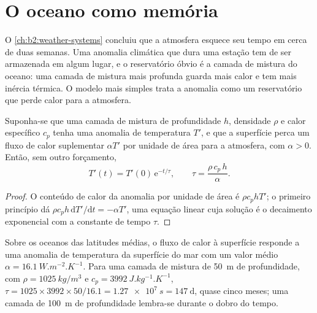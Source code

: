 \section{O oceano como memória}\label{sec:b2:climate-variability:memory}

O \cref{ch:b2:weather-systems} concluiu que a atmosfera esquece seu tempo em cerca de duas semanas.
Uma anomalia climática que dura uma estação tem de ser armazenada em algum lugar, e o reservatório óbvio é a camada
de mistura do oceano: uma camada de mistura mais profunda guarda mais calor e tem mais inércia térmica. O modelo mais simples trata a
anomalia como um reservatório que perde calor para a atmosfera.

\begin{proposition}\label{prop:b2:climate-variability:damping}
Suponha-se que uma camada de mistura de profundidade $h$, densidade $\rho$ e calor específico $c_p$ tenha uma anomalia de temperatura
$T'$, e que a superfície perca um fluxo de calor suplementar $\alpha T'$ por unidade de área para a atmosfera,
com $\alpha > 0$. Então, sem outro forçamento,
\[
  T'(t) = T'(0)\,\mathrm{e}^{-t/\tau}, \qquad \tau = \frac{\rho\,c_p\,h}{\alpha} .
\]
\end{proposition}

\begin{proof}
O conteúdo de calor da anomalia por unidade de área é $\rho c_p h T'$; o primeiro princípio dá $\rho c_p h
\,\mathrm{d}T'/\mathrm{d}t = -\alpha T'$, uma equação linear cuja solução é o decaimento
exponencial com a constante de tempo $\tau$.
\end{proof}

\begin{example}\label{ex:b2:climate-variability:tau}
Sobre os oceanos das latitudes médias, o fluxo de calor à superfície responde a uma anomalia de temperatura da superfície
do mar com um valor médio $\alpha = \qty{16.1}{W.m^{-2}.K^{-1}}$. Para uma camada de mistura
de \qty{50}{m} de profundidade, com $\rho = \qty{1025}{kg/m^3}$ e $c_p = \qty{3992}{J.kg^{-1}.K^{-1}}$,
$\tau = 1025 \times 3992 \times 50/16.1 = \qty{1.27e7}{s} = \qty{147}{\day}$, quase cinco
meses; uma camada de \qty{100}{m} de profundidade lembra-se durante o dobro do tempo.
\end{example}

